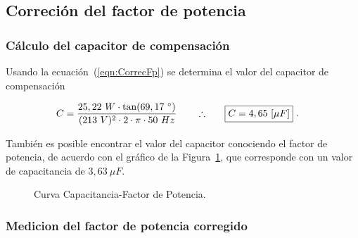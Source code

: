   \subsection{Correción del factor de potencia}
    \subsubsection{Cálculo del capacitor de compensación}
      
       Usando la ecuación~(\ref{eqn:CorrecFp}) se determina el valor del capacitor de compensación

      \begin{align*}
        C = \frac{25,22~W \cdot \tan(69,17~^{\circ} )}{(213~V)^2 \cdot 2 \cdot \pi \cdot 50~Hz }  \hspace{20pt} \therefore \hspace{20pt} \Aboxed{C = 4,65~[\mu F]}~.
      \end{align*}

        También es posible encontrar el valor del capacitor conociendo el factor de potencia, de acuerdo
        con el gráfico de la Figura~\ref{fig: Curva Cap_FDP}, que corresponde con un valor de capacitancia de $3,63~\mu F$. 

        \begin{figure}[H]
          \centering
            \caption{Curva Capacitancia-Factor de Potencia.}
            \label{fig: Curva Cap_FDP}
        \end{figure}

        

    \subsubsection{Medicion del factor de potencia corregido}

